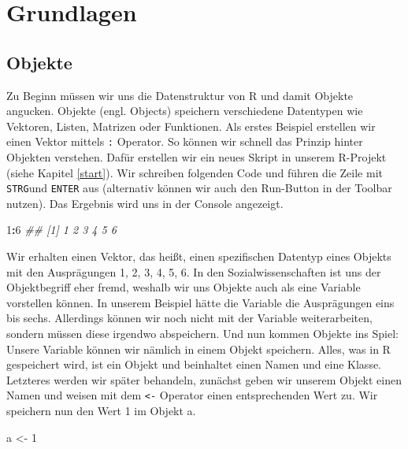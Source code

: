\documentclass[
]{book}
\newenvironment{Shaded}{\begin{snugshade}}{\end{snugshade}}
\newcommand{\CommentTok}[1]{\textcolor[rgb]{0.56,0.35,0.01}{\textit{#1}}}
\newcommand{\DecValTok}[1]{\textcolor[rgb]{0.00,0.00,0.81}{#1}}
\newcommand{\NormalTok}[1]{#1}
\newcommand{\OperatorTok}[1]{\textcolor[rgb]{0.81,0.36,0.00}{\textbf{#1}}}
\newcommand{\StringTok}[1]{\textcolor[rgb]{0.31,0.60,0.02}{#1}}
\begin{document}
\hypertarget{grundlagen}{%
\chapter{Grundlagen}\label{grundlagen}}

\hypertarget{objekte}{%
\section{Objekte}\label{objekte}}

Zu Beginn müssen wir uns die Datenstruktur von R und damit Objekte angucken. Objekte (engl. Objects) speichern verschiedene Datentypen wie Vektoren, Listen, Matrizen oder Funktionen. Als erstes Beispiel erstellen wir einen Vektor mittels \texttt{:} Operator. So können wir schnell das Prinzip hinter Objekten verstehen. Dafür erstellen wir ein neues Skript in unserem R-Projekt (siehe Kapitel \ref{start}). Wir schreiben folgenden Code und führen die Zeile mit \texttt{STRG}und \texttt{ENTER} aus (alternativ können wir auch den Run-Button in der Toolbar nutzen). Das Ergebnis wird uns in der Console angezeigt.

\begin{Shaded}
\begin{Highlighting}[]
\DecValTok{1}\OperatorTok{:}\DecValTok{6}
\CommentTok{## [1] 1 2 3 4 5 6}
\end{Highlighting}
\end{Shaded}

Wir erhalten einen Vektor, das heißt, einen spezifischen Datentyp eines Objekts mit den Ausprägungen 1, 2, 3, 4, 5, 6. In den Sozialwissenschaften ist uns der Objektbegriff eher fremd, weshalb wir uns Objekte auch als eine Variable vorstellen können. In unserem Beispiel hätte die Variable die Ausprägungen eins bis sechs. Allerdings können wir noch nicht mit der Variable weiterarbeiten, sondern müssen diese irgendwo abspeichern. Und nun kommen Objekte ins Spiel: Unsere Variable können wir nämlich in einem Objekt speichern. Alles, was in R gespeichert wird, ist ein Objekt und beinhaltet einen Namen und eine Klasse. Letzteres werden wir später behandeln, zunächst geben wir unserem Objekt einen Namen und weisen mit dem \texttt{\textless{}-} Operator einen entsprechenden Wert zu. Wir speichern nun den Wert 1 im Objekt a.

\begin{Shaded}
\begin{Highlighting}[]
\NormalTok{a <-}\StringTok{ }\DecValTok{1}
\end{Highlighting}
\end{Shaded}
\end{document}
